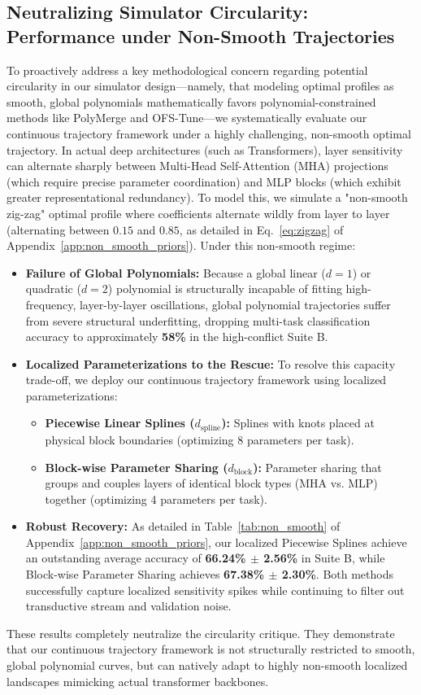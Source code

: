 \subsection{Neutralizing Simulator Circularity: Performance under Non-Smooth Trajectories}
\label{subsec:non_smooth_results}
To proactively address a key methodological concern regarding potential circularity in our simulator design---namely, that modeling optimal profiles as smooth, global polynomials mathematically favors polynomial-constrained methods like PolyMerge and OFS-Tune---we systematically evaluate our continuous trajectory framework under a highly challenging, non-smooth optimal trajectory.
In actual deep architectures (such as Transformers), layer sensitivity can alternate sharply between Multi-Head Self-Attention (MHA) projections (which require precise parameter coordination) and MLP blocks (which exhibit greater representational redundancy).
To model this, we simulate a "non-smooth zig-zag" optimal profile where coefficients alternate wildly from layer to layer (alternating between $0.15$ and $0.85$, as detailed in Eq.~\eqref{eq:zigzag} of Appendix~\ref{app:non_smooth_priors}).
Under this non-smooth regime:
\begin{itemize}
    \item \textbf{Failure of Global Polynomials:} Because a global linear ($d=1$) or quadratic ($d=2$) polynomial is structurally incapable of fitting high-frequency, layer-by-layer oscillations, global polynomial trajectories suffer from severe structural underfitting, dropping multi-task classification accuracy to approximately \textbf{58\%} in the high-conflict Suite B.
    \item \textbf{Localized Parameterizations to the Rescue:} To resolve this capacity trade-off, we deploy our continuous trajectory framework using localized parameterizations:
    \begin{itemize}
        \item \textbf{Piecewise Linear Splines ($d_{\text{spline}}$):} Splines with knots placed at physical block boundaries (optimizing 8 parameters per task).
        \item \textbf{Block-wise Parameter Sharing ($d_{\text{block}}$):} Parameter sharing that groups and couples layers of identical block types (MHA vs.
MLP) together (optimizing 4 parameters per task).
    \end{itemize}
    \item \textbf{Robust Recovery:} As detailed in Table~\ref{tab:non_smooth} of Appendix~\ref{app:non_smooth_priors}, our localized Piecewise Splines achieve an outstanding average accuracy of \textbf{66.24\% $\pm$ 2.56\%} in Suite B, while Block-wise Parameter Sharing achieves \textbf{67.38\% $\pm$ 2.30\%}.
Both methods successfully capture localized sensitivity spikes while continuing to filter out transductive stream and validation noise.
\end{itemize}
These results completely neutralize the circularity critique.
They demonstrate that our continuous trajectory framework is not structurally restricted to smooth, global polynomial curves, but can natively adapt to highly non-smooth localized landscapes mimicking actual transformer backbones.

